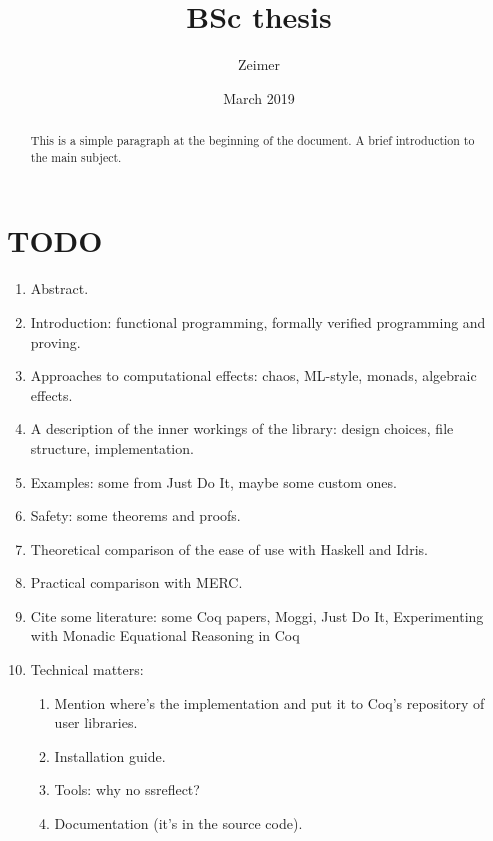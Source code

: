 \documentclass[11pt]{article}
\begin{document}
\title{BSc thesis}
\author{Zeimer}
\date{March 2019}

\begin{titlepage}

    \maketitle

    \begin{abstract}
    This is a simple paragraph at the beginning of the document. A brief introduction to the main subject.
    \end{abstract}

    \tableofcontents

\end{titlepage}

\section{TODO} \label{TODO}

\begin{enumerate}
    \item Abstract.
    \item Introduction: functional programming, formally verified programming and proving.
    \item Approaches to computational effects: chaos, ML-style, monads, algebraic effects.
    \item A description of the inner workings of the library: design choices, file structure, implementation.
    \item Examples: some from Just Do It, maybe some custom ones.
    \item Safety: some theorems and proofs.
    \item Theoretical comparison of the ease of use with Haskell and Idris.
    \item Practical comparison with MERC.
    \item Cite some literature: some Coq papers, Moggi, Just Do It, Experimenting with Monadic Equational Reasoning in Coq
    \item Technical matters:
    \begin{enumerate}
        \item Mention where's the implementation and put it to Coq's repository of user libraries.
        \item Installation guide.
        \item Tools: why no ssreflect?
        \item Documentation (it's in the source code).
    \end{enumerate}
\end{enumerate}
\end{document}
